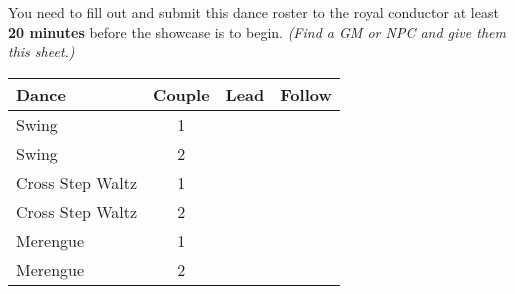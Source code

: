 \documentclass[green]{NeptuneBall}
\begin{document}
\name{\gRoster{}}

You need to fill out and submit this dance roster to the royal conductor at least {\bf 20 minutes} before the showcase is to begin. \emph{(Find a GM or NPC and give them this sheet.)}\\

\begin{tabular}{| l | c | r | r |}
 \hline
 Dance & Couple  & Lead & Follow \\ \hline \hline
 Swing & 1 & \hspace{4cm} & \hspace{4cm} \\ \hline
 Swing & 2 & \hspace{4cm} & \hspace{4cm} \\ \hline
 Cross Step Waltz & 1 & \hspace{4cm} & \hspace{4cm} \\ \hline
 Cross Step Waltz & 2 & \hspace{4cm} & \hspace{4cm} \\ \hline
 Merengue & 1 & \hspace{4cm} & \hspace{4cm} \\ \hline
 Merengue & 2 & \hspace{4cm} & \hspace{4cm} \\ \hline
\end{tabular}
\end{document}
